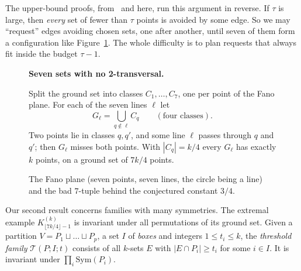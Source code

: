 \documentclass[11pt]{amsart}
\theoremstyle{definition}
\theoremstyle{remark}
\begin{document}
The upper-bound proofs, from~\cite{FKW} and here, run this argument in reverse. If $\tau$ is large, then \emph{every} set of fewer than $\tau$ points is avoided by some edge. So we may ``request'' edges avoiding chosen sets, one after another, until seven of them form a configuration like Figure~\ref{fig:fano}. The whole difficulty is to plan requests that always fit inside the budget $\tau-1$.


\begin{figure}[t]
\centering
\begin{minipage}{0.4\textwidth}\centering
{}
\end{minipage}\hfill
\begin{minipage}{0.55\textwidth}\small
\textbf{Seven sets with no 2-transversal.}\par\smallskip
    Split the ground set into classes $C_1,\dots,C_7$, one per point of the Fano plane. For each of the seven lines $\ell$ let
    \[G_\ell=\textstyle\bigcup_{q\notin\ell}C_q\qquad(\text{four classes}).\]
    Two points lie in classes $q,q'$, and some line $\ell$ passes through $q$ and $q'$; then $G_\ell$ misses both points. With $|C_q|=k/4$ every $G_\ell$ has exactly $k$ points, on a ground set of $7k/4$ points.
\end{minipage}
\caption{The Fano plane (seven points, seven lines, the circle being a line) and the bad $7$-tuple behind the conjectured constant $3/4$.}\label{fig:fano}
\end{figure}

Our second result concerns families with many symmetries. The extremal example $K^{(k)}_{\lfloor7k/4\rfloor-1}$ is invariant under all permutations of its ground set. Given a partition $V=P_1\sqcup\dots\sqcup P_p$, a set $I$ of \emph{boxes} and integers $1\le t_i\le k$, the \emph{threshold family} $\mathcal T(P;I;t)$ consists of all $k$-sets $E$ with $|E\cap P_i|\ge t_i$ for some $i\in I$. It is invariant under $\prod_i\mathrm{Sym}(P_i)$.
\end{document}
